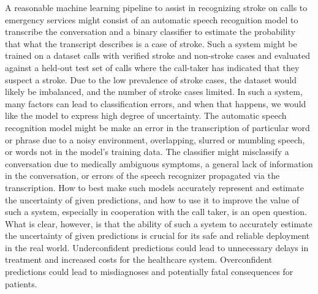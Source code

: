 A reasonable machine learning pipeline to assist in recognizing stroke on calls to emergency services might consist of an automatic speech recognition model to transcribe the conversation and a binary classifier to estimate the probability that what the transcript describes is a case of stroke. 
Such a system might be trained on a dataset calls with verified stroke and non-stroke cases and evaluated against a held-out test set of calls where the call-taker has indicated that they suspect a stroke. Due to the low prevalence of stroke cases, the dataset would likely be imbalanced, and the number of stroke cases limited. 
In such a system, many factors can lead to classification errors, and when that happens, we would like the model to express high degree of uncertainty. 
The automatic speech recognition model might be make an error in the transcription of particular word or phrase due to a noisy environment, overlapping, slurred or mumbling speech, or words not in the model's training data. 
The classifier might misclassify a conversation due to medically ambiguous symptoms, a general lack of information in the conversation, or errors of the speech recognizer propagated via the transcription. 
How to best make such models accurately represent and estimate the uncertainty of given predictions, and how to use it to improve the value of such a system, especially in cooperation with the call taker, is an open question.
What is clear, however, is that the ability of such a system to accurately estimate the uncertainty of given predictions is crucial for its safe and reliable deployment in the real world. Underconfident predictions could lead to unnecessary delays in treatment and increased costs for the healthcare system. Overconfident predictions could lead to misdiagnoses and potentially fatal consequences for patients.


